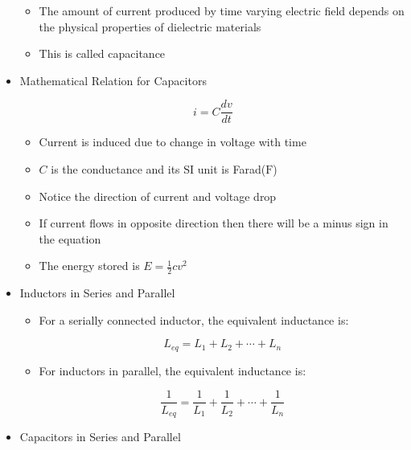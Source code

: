 \begin{itemize}
\begin{itemize}
      \item The amount of current produced by time varying electric field depends on the physical properties of dielectric materials

      \item This is called capacitance

    \end{itemize}

  \item Mathematical Relation for Capacitors

        $$\boxed{i=C\frac{dv}{dt}}$$

    \begin{itemize}

      \item Current is induced due to change in voltage with time

      \item $C$ is the conductance and its SI unit is Farad($\si{\farad}$)

      \item Notice the direction of current and voltage drop

      \item If current flows in opposite direction then there will be a minus sign in the equation

      \item The energy stored is $E=\frac{1}{2}cv^2$

    \end{itemize}

  \item Inductors in Series and Parallel

    \begin{itemize}

      \item For a serially connected inductor, the equivalent inductance is:

        $$\boxed{L_{eq}=L_1+L_2+\cdots+L_n}$$

      \item For inductors in parallel, the equivalent inductance is:

        $$\boxed{\dfrac{1}{L_{eq}}=\dfrac{1}{L_1}+\dfrac{1}{L_2}+\cdots+\dfrac{1}{L_n}}$$

    \end{itemize}

  \item Capacitors in Series and Parallel

    \begin{itemize}


\end{itemize}
\end{itemize}
